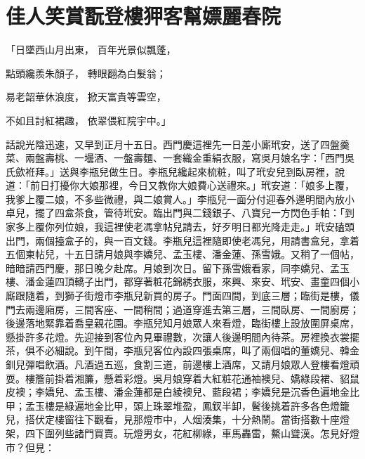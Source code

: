 %

\chapter{佳人笑賞翫登樓\KG 狎客幫嫖麗春院}

\begin{showcontents}{}



「日墜西山月出東，  百年光景似飄蓬，

點頭纔羨朱顏子，  轉眼翻為白髮翁；

易老韶華休浪度，  掀天富貴等雲空，

不如且討紅裙趣，  依翠偎紅院宇中。」

話說光陰迅速，又早到正月十五日。西門慶這裡先一日差小廝玳安，送了四盤羹菜、兩盤壽桃、一壜酒、一盤壽麵、一套織金重絹衣服，寫吳月娘名字：「西門吳氏歛袵拜。」送與李瓶兒做生日。李瓶兒纔起來梳粧，叫了玳安兒到臥房裡，說道：「前日打擾你大娘那裡，今日又教你大娘費心送禮來。」玳安道：「娘多上覆，我爹上覆二娘，不多些微禮，與二娘賞人。」李瓶兒一面分付迎春外邊明間內放小卓兒，擺了四盒茶食，管待玳安。臨出門與二錢銀子、八寶兒一方閃色手帕：「到家多上覆你列位娘，我這裡使老馮拿帖兒請去，好歹明日都光降走走。」玳安磕頭出門，兩個擡盒子的，與一百文錢。李瓶兒這裡隨即使老馮兒，用請書盒兒，拿着五個柬帖兒，十五日請月娘與李嬌兒、孟玉樓、潘金蓮、孫雪娥。又稍了一個帖，暗暗請西門慶，那日晚夕赴席。月娘到次日。留下孫雪娥看家，同李嬌兒、孟玉樓、潘金蓮四頂轎子出門，都穿著粧花錦綉衣服，來興、來安、玳安、畫童四個小廝跟隨着，到獅子街燈巿李瓶兒新買的房子。門面四間，到底三層；臨街是樓，儀門去兩邊廂房，三間客座、一間稍間；過道穿進去第三層，三間臥房、一間廚房；後邊落地緊靠着喬皇親花園。李瓶兒知月娘眾人來看燈，臨街樓上設放圍屏桌席，懸掛許多花燈。先迎接到客位內見畢禮數，次讓人後邊明間內待茶。房裡換衣裳擺茶，俱不必細說。到午間，李瓶兒客位內設四張桌席，叫了兩個唱的董嬌兒、韓金釧兒彈唱飲酒。凡酒過五巡，食割三道，前邊樓上酒席，又請月娘眾人登樓看燈頑耍。樓簷前掛着湘簾，懸着彩燈。吳月娘穿着大紅粧花通袖襖兒、嬌綠段裙、貂鼠皮襖；李嬌兒、孟玉樓、潘金蓮都是白綾襖兒、藍段裙；李嬌兒是沉香色遍地金比甲；孟玉樓是綠遍地金比甲，頭上珠翠堆盈，鳳釵半卸，鬢後挑着許多各色燈籠兒，搭伏定樓窗往下觀看，見那燈巿中，人烟湊集，十分熱鬧。當街搭數十座燈架，四下圍列些諸門買賣。玩燈男女，花紅柳綠，車馬轟雷，鰲山聳漢。怎見好燈巿？但見：


\end{showcontents}
